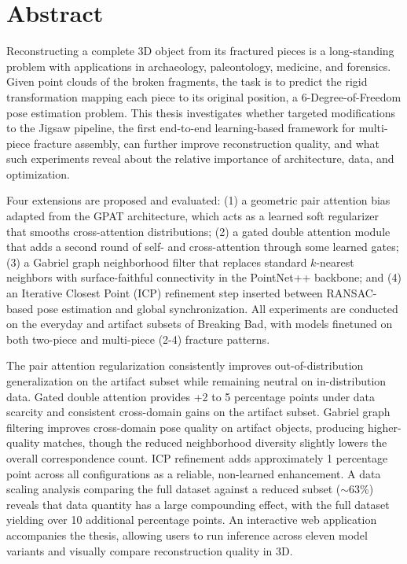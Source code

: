 \documentclass[12pt]{report}
\begin{document}
\newpage
\thispagestyle{empty}
\mbox{}
\newpage
{}

\chapter*{Abstract}

Reconstructing a complete 3D object from its fractured pieces is a long-standing problem with applications in archaeology, paleontology, medicine, and forensics. Given point clouds of the broken fragments, the task is to predict the rigid transformation mapping each piece to its original position, a 6-Degree-of-Freedom pose estimation problem. This thesis investigates whether targeted modifications to the Jigsaw pipeline, the first end-to-end learning-based framework for multi-piece fracture assembly, can further improve reconstruction quality, and what such experiments reveal about the relative importance of architecture, data, and optimization.

Four extensions are proposed and evaluated: (1) a geometric pair attention bias adapted from the GPAT architecture, which acts as a learned soft regularizer that smooths cross-attention distributions; (2) a gated double attention module that adds a second round of self- and cross-attention through some learned gates; (3) a Gabriel graph neighborhood filter that replaces standard $k$-nearest neighbors with surface-faithful connectivity in the PointNet++ backbone; and (4) an Iterative Closest Point (ICP) refinement step inserted between RANSAC-based pose estimation and global synchronization. All experiments are conducted on the everyday and artifact subsets of Breaking Bad, with models finetuned on both two-piece and multi-piece (2-4) fracture patterns.

The pair attention regularization consistently improves out-of-distribution generalization on the artifact subset while remaining neutral on in-distribution data. Gated double attention provides +2 to 5 percentage points under data scarcity and consistent cross-domain gains on the artifact subset. Gabriel graph filtering improves cross-domain pose quality on artifact objects, producing higher-quality matches, though the reduced neighborhood diversity slightly lowers the overall correspondence count. ICP refinement adds approximately 1 percentage point across all configurations as a reliable, non-learned enhancement. A data scaling analysis comparing the full dataset against a reduced subset ($\sim$63\%) reveals that data quantity has a large compounding effect, with the full dataset yielding over 10 additional percentage points. An interactive web application accompanies the thesis, allowing users to run inference across eleven model variants and visually compare reconstruction quality in 3D.
\end{document}

